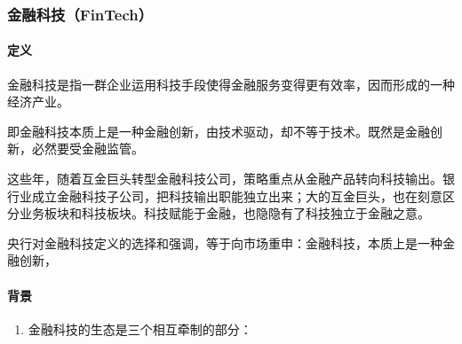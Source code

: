 \documentclass[letterpaper,10pt,english]{sphinxmanual}
\begin{document}
\subsubsection{金融科技（FinTech）}
\label{\detokenize{chapter_AI+Finance/FinTech:fintech}}\label{\detokenize{chapter_AI+Finance/FinTech:id1}}\label{\detokenize{chapter_AI+Finance/FinTech::doc}}

\paragraph{定义}
\label{\detokenize{chapter_AI+Finance/FinTech:id2}}
金融科技是指一群企业运用科技手段使得金融服务变得更有效率，因而形成的一种经济产业。%
\begin{footnote}[1091]\sphinxAtStartFootnote
{}
%
\end{footnote}

即金融科技本质上是一种金融创新，由技术驱动，却不等于技术。既然是金融创新，必然要受金融监管。

这些年，随着互金巨头转型金融科技公司，策略重点从金融产品转向科技输出。银行业成立金融科技子公司，把科技输出职能独立出来；大的互金巨头，也在刻意区分业务板块和科技板块。科技赋能于金融，也隐隐有了科技独立于金融之意。

央行对金融科技定义的选择和强调，等于向市场重申：金融科技，本质上是一种金融创新，%
\begin{footnote}[1092]\sphinxAtStartFootnote
{}
%
\end{footnote}


\paragraph{背景}
\label{\detokenize{chapter_AI+Finance/FinTech:id3}}\begin{enumerate}
%
\item {} 
金融科技的生态是三个相互牵制的部分：

\end{enumerate}
\end{document}
